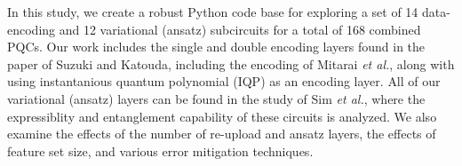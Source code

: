 \documentclass[journal=jacsat,manuscript=article]{achemso}
\begin{document}
In this study, we create a robust Python code base for exploring a set of 14 data-encoding and 12 variational (ansatz) subcircuits for a total of 168 combined PQCs.
Our work includes the single and double encoding layers found in the paper of Suzuki and Katouda\cite{suzuki_predicting_2020}, including the encoding of Mitarai \textit{et al.}\cite{mitarai_quantum_2018}, along with using instantanious quantum polynomial (IQP) as an encoding layer. \cite{bremner_average-case_2015}
All of our variational (ansatz) layers can be found in the study of Sim \textit{et al.}\cite{sim_expressibility_2019}, where the expressiblity and entanglement capability of these circuits is analyzed.
We also examine the effects of the number of re-upload and ansatz layers, the effects of feature set size, and various error mitigation techniques. 







\cite{krenn_artificial_2023}
\end{document}
